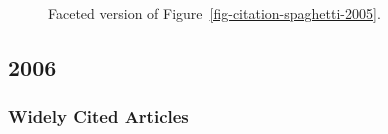 \documentclass[
  10pt,
  letterpaper,
  DIV=11,
  numbers=noendperiod,
  twoside]{scrartcl}
\begin{document}
\begin{figure}


\caption{\label{fig-citation-facet-2005}Faceted version of
Figure~\ref{fig-citation-spaghetti-2005}.}

\end{figure}%

\newpage

\subsection{2006}\label{sec-s2006}

\subsubsection*{Widely Cited Articles}\label{widely-cited-articles-50}
\end{document}
